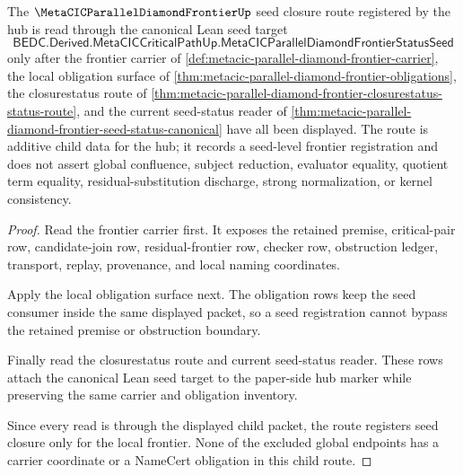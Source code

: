 \begin{theorem}
\label{thm:metacic-parallel-diamond-frontier-additive-seed-closure-route}
The $\MetaCICParallelDiamondFrontierUp$ seed closure route registered by the hub is read through the canonical Lean seed target
$$
\mathsf{BEDC.Derived.MetaCICCriticalPathUp.MetaCICParallelDiamondFrontierStatusSeed}
$$
only after the frontier carrier of \autoref{def:metacic-parallel-diamond-frontier-carrier}, the local obligation surface of \autoref{thm:metacic-parallel-diamond-frontier-obligations}, the closurestatus route of \autoref{thm:metacic-parallel-diamond-frontier-closurestatus-status-route}, and the current seed-status reader of \autoref{thm:metacic-parallel-diamond-frontier-seed-status-canonical} have all been displayed. The route is additive child data for the hub; it records a seed-level frontier registration and does not assert global confluence, subject reduction, evaluator equality, quotient term equality, residual-substitution discharge, strong normalization, or kernel consistency.
\end{theorem}
\begin{proof}
Read the frontier carrier first. It exposes the retained premise, critical-pair row, candidate-join row, residual-frontier row, checker row, obstruction ledger, transport, replay, provenance, and local naming coordinates.

Apply the local obligation surface next. The obligation rows keep the seed consumer inside the same displayed packet, so a seed registration cannot bypass the retained premise or obstruction boundary.

Finally read the closurestatus route and current seed-status reader. These rows attach the canonical Lean seed target to the paper-side hub marker while preserving the same carrier and obligation inventory.

Since every read is through the displayed child packet, the route registers seed closure only for the local frontier. None of the excluded global endpoints has a carrier coordinate or a NameCert obligation in this child route.
\end{proof}
